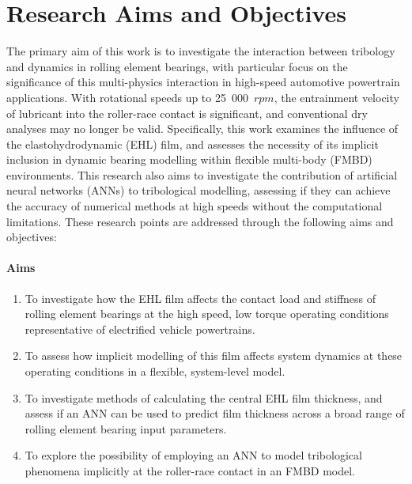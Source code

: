 \section{Research Aims and Objectives} \label{Research Questions}

The primary aim of this work is to investigate the interaction between tribology and dynamics in rolling element bearings, with particular focus on the significance of this multi-physics interaction in high-speed automotive powertrain applications. With rotational speeds up to 25~000~$rpm$, the entrainment velocity of lubricant into the roller-race contact is significant, and conventional dry analyses may no longer be valid. Specifically, this work examines the influence of the elastohydrodynamic (EHL) film, and assesses the necessity of its implicit inclusion in dynamic bearing modelling within flexible multi-body (FMBD) environments. This research also aims to investigate the contribution of artificial neural networks (ANNs) to tribological modelling, assessing if they can achieve the accuracy of numerical methods at high speeds without the computational limitations. These research points are addressed through the following aims and objectives:

\paragraph{Aims}
\begin{enumerate}
	\item To investigate how the EHL film affects the contact load and stiffness of rolling element bearings at the high speed, low torque operating conditions representative of electrified vehicle powertrains. 
	\item To assess how implicit modelling of this film affects system dynamics at these operating conditions in a flexible, system-level model.
	\item To investigate methods of calculating the central EHL film thickness, and assess if an ANN can be used to predict film thickness across a broad range of rolling element bearing input parameters.
	\item To explore the possibility of employing an ANN to model tribological phenomena implicitly at the roller-race contact in an FMBD model. 
\end{enumerate}

